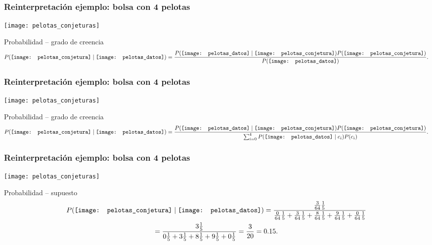 \documentclass[table]{beamer}
\begin{document}
\begin{frame}
    \frametitle{Reinterpretación ejemplo: bolsa con 4 pelotas}
    \begin{center}
        \texttt{[image: pelotas\_conjeturas]}
    \end{center}
    \begin{block}{Probabilidad -- grado de creencia}
        \begin{equation*}
            \prob{\texttt{[image: pelotas\_conjetura]} \mid
            \texttt{[image: pelotas\_datos]}} =
            \frac{\prob{\texttt{[image: pelotas\_datos]} \mid
            \texttt{[image: pelotas\_conjetura]}}
            \prob{\texttt{[image: pelotas\_conjetura]}}}{\prob{\texttt{[image: pelotas\_datos]}}} .
        \end{equation*}
    \end{block}
\end{frame}

\begin{frame}
    \frametitle{Reinterpretación ejemplo: bolsa con 4 pelotas}
    \begin{center}
        \texttt{[image: pelotas\_conjeturas]}
    \end{center}
    \begin{block}{Probabilidad -- grado de creencia}
        \begin{equation*}
            \prob{\texttt{[image: pelotas\_conjetura]} \mid
            \texttt{[image: pelotas\_datos]}} =
            \frac{\prob{\texttt{[image: pelotas\_datos]} \mid
            \texttt{[image: pelotas\_conjetura]}}
            \prob{\texttt{[image: pelotas\_conjetura]}}}{
                \sum_{i = 0}^{4} \prob{\texttt{[image: pelotas\_datos]} \mid c_{i}} \prob{c_{i}}} .
        \end{equation*}
    \end{block}
\end{frame}

\begin{frame}
    \frametitle{Reinterpretación ejemplo: bolsa con 4 pelotas}
    \begin{center}
        \texttt{[image: pelotas\_conjeturas]}
    \end{center}
    \begin{block}{Probabilidad -- supuesto}
        \begin{multline*}
            \prob{\texttt{[image: pelotas\_conjetura]} \mid
            \texttt{[image: pelotas\_datos]}} =
            \frac{\frac{3}{64} \frac{1}{5}}{\frac{0}{64} \frac{1}{5} + \frac{3}{64} \frac{1}{5} + \frac{8}{64} \frac{1}{5} + \frac{9}{64} \frac{1}{5} + \frac{0}{64} \frac{1}{5}} \\
            = \frac{3 \frac{1}{5}}{0 \frac{1}{5} + 3 \frac{1}{5} + 8 \frac{1}{5} + 9 \frac{1}{5} + 0 \frac{1}{5}}
            = \frac{3}{20} = 0.15 .
        \end{multline*}
    \end{block}
\end{frame}
\end{document}
